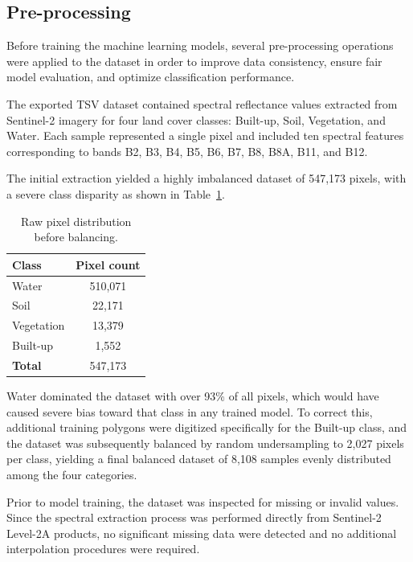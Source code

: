 \documentclass{article}
\begin{document}
\subsection{Pre-processing}

Before training the machine learning models, several pre-processing operations were applied to the dataset in order to improve data consistency, ensure
fair model evaluation, and optimize classification performance.

The exported TSV dataset contained spectral reflectance values extracted from Sentinel-2 imagery for four land cover classes: Built-up, Soil, Vegetation,
and Water. Each sample represented a single pixel and included ten spectral features corresponding to bands B2, B3, B4, B5, B6, B7, B8, B8A, B11, and B12.

The initial extraction yielded a highly imbalanced dataset of 547{,}173 pixels,
with a severe class disparity as shown in Table~\ref{tab:raw_distribution}.

\begin{table}[H]
    \centering
    \caption{Raw pixel distribution before balancing.}
    \label{tab:raw_distribution}
    \begin{tabular}{lc}
        \hline
        \textbf{Class} & \textbf{Pixel count} \\
        \hline
        Water      & 510{,}071 \\
        Soil       & 22{,}171 \\
        Vegetation & 13{,}379 \\
        Built-up   & 1{,}552 \\
        \hline
        \textbf{Total} & 547{,}173 \\
        \hline
    \end{tabular}
\end{table}

Water dominated the dataset with over 93\% of all pixels, which would have
caused severe bias toward that class in any trained model. To correct this,
additional training polygons were digitized specifically for the Built-up class,
and the dataset was subsequently balanced by random undersampling to 2{,}027
pixels per class, yielding a final balanced dataset of 8{,}108 samples evenly
distributed among the four categories.

Prior to model training, the dataset was inspected for missing or invalid values. Since the spectral extraction process was performed directly from
Sentinel-2 Level-2A products, no significant missing data were detected and no additional interpolation procedures were required.
\end{document}
